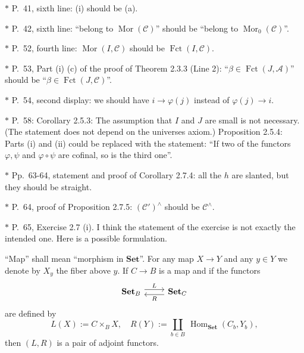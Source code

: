 \documentclass[12pt]{article}
\theoremstyle{remark}
\theoremstyle{definition}
\newcommand{\A}{\mathcal A}
\newcommand{\C}{\mathcal C}
\newcommand{\oo}{\operatorname}
\newcommand{\Set}{\mathbf{Set}}
\DeclareMathOperator{\Hom}{Hom}%
\DeclareMathOperator{\Mor}{Mor}
\DeclareMathOperator{\op}{op}
\begin{document}
\noindent $*$ P.~41, sixth line: (i) should be (a).

\noindent $*$ P.~42, sixth line: ``belong to $\Mor(\C)$'' should be ``belong to $\Mor_0(\C)$''.

\noindent $*$ P.~52, fourth line: $\Mor(I,\C)$ should be $\oo{Fct}(I,\C)$.

\noindent $*$ P.~53, Part (i) (c) of the proof of Theorem 2.3.3 (Line 2): ``$\beta\in\oo{Fct}(J,\A)$'' should be ``$\beta\in\oo{Fct}(J,\C)$''.

\noindent $*$ P.~54, second display: we should have $i\to\varphi(j)$ instead of $\varphi(j)\to i$.



\noindent $*$ P.~58: Corollary 2.5.3: The assumption that $I$ and $J$ are small is not necessary. (The statement does not depend on the universes axiom.) Proposition 2.5.4: Parts (i) and (ii) could be replaced with the statement: ``If two of the functors $\varphi,\psi$ and $\varphi\circ\psi$ are cofinal, so is the third one''.

\noindent $*$ Pp.~63-64, statement and proof of Corollary 2.7.4: all the $h$ are slanted, but they should be straight.

\noindent $*$ P.~64, proof of Proposition 2.7.5: $(\C')^\wedge$ should be $\C^\wedge$.

\noindent $*$ P.~65, Exercise 2.7 (i). I think the statement of the exercise is not exactly the intended one. Here is a possible formulation.

``Map'' shall mean ``morphism in $\Set$''. For any map $X\to Y$ and any $y\in Y$ we denote by $X_y$ the fiber above $y$. If $C\to B$ is a map and if the functors 
$$
\begin{tikzcd}
\Set_B\ar[yshift=.7ex]{r}{L}&\Set_C\ar[yshift=-.7ex]{l}{R}
\end{tikzcd}
$$ 
are defined by 
$$
L(X):=C\times_BX,\quad R(Y):=\coprod_{b\in B}\ \Hom_{\Set}(C_b,Y_b),
$$ 
then $(L,R)$ is a pair of adjoint functors.
\end{document}
